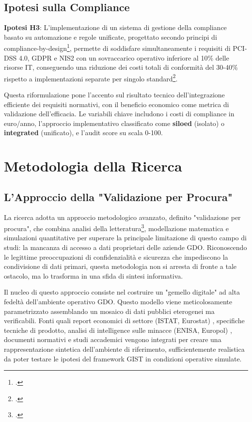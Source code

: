 \subsection{\texorpdfstring{\textbf{Ipotesi sulla
Compliance}}{1.4.3 Ipotesi sulla Compliance}}\label{ipotesi-sulla-compliance}

\textbf{Ipotesi H3}: L'implementazione di un sistema di gestione della compliance basato su automazione e regole unificate, progettato secondo principi di compliance-by-design\footcite{isaca2024compliance}, permette di soddisfare simultaneamente i requisiti di PCI-DSS 4.0, GDPR e NIS2 con un sovraccarico operativo inferiore al 10\% delle risorse IT, conseguendo una riduzione dei costi
totali di conformità del 30-40\% rispetto a implementazioni separate per singolo standard\footcite{pwc2024integrated}.

Questa riformulazione pone l'accento sul risultato tecnico
dell'integrazione efficiente dei requisiti normativi, con il beneficio economico come metrica di validazione dell'efficacia. Le variabili chiave includono i costi di compliance in euro/anno, l'approccio implementativo classificato come \textbf{siloed} (isolato)  o \textbf{integrated} (unificato), e l'audit score su scala 0-100.
\section{\texorpdfstring{\textbf {Metodologia della Ricerca}}{1.5 Metodologia della Ricerca}}\label{metodologia-della-ricerca}
\subsection{\texorpdfstring{\textbf{L'Approccio della "Validazione per Procura"}}{1.5.1 L'Approccio della "Validazione per Procura"}}\label{approccio-validazione-per-procura}
La ricerca adotta un approccio metodologico avanzato, definito "validazione per procura", che combina analisi della letteratura\footcite{gartner2024itmetrics}, modellazione matematica e simulazioni quantitative per superare la principale limitazione di questo campo di studi: la mancanza di accesso a dati proprietari delle aziende GDO. Riconoscendo le legittime preoccupazioni di confidenzialità e sicurezza che impediscono la condivisione di dati primari, questa metodologia non si arresta di fronte a tale ostacolo, ma lo trasforma in una sfida di sintesi informativa.   

Il nucleo di questo approccio consiste nel costruire un "gemello digitale" ad alta fedeltà dell'ambiente operativo GDO. Questo modello viene meticolosamente parametrizzato assemblando un mosaico di dati pubblici eterogenei ma verificabili. Fonti quali report economici di settore (ISTAT, Eurostat) , specifiche tecniche di prodotto, analisi di intelligence sulle minacce (ENISA, Europol) , documenti normativi e studi accademici vengono integrati per creare una rappresentazione sintetica dell'ambiente di riferimento, sufficientemente realistica da poter testare le ipotesi del framework GIST in condizioni operative simulate.   

